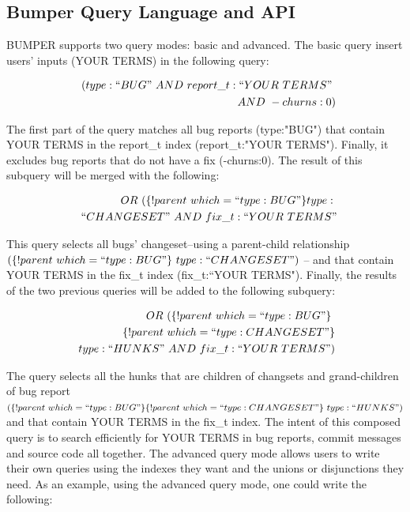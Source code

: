 \documentclass[conference]{IEEEtran}
\begin{document}
\subsection{Bumper Query Language and API}
\label{sub:Bumper Query Language and API}

BUMPER supports two query modes: basic and advanced.
The basic query insert users' inputs (YOUR TERMS) in the
following query:

\begin{equation*}
\begin{split}
~~(type:``BUG"~AND~report\_t:``YOUR~TERMS"~\\
~~AND~-churns:0)
\end{split}
\end{equation*}



The first part of the query matches all bug reports
(type:"BUG") that contain YOUR TERMS in the report\_t index
(report\_t:"YOUR TERMS").
Finally, it excludes bug reports that
do not have a fix (-churns:0).
The result of this subquery will be
merged with the following:

\begin{equation*}
\begin{split}
~~OR~(\{!parent~which=``type:BUG"\}type:~\\
~~``CHANGESET"~AND~fix\_t:``YOUR~TERMS"
\end{split}
\end{equation*}

This query selects all bugs' changeset--using a parent-child
relationship $(\{!parent~which=``type:BUG"\}~type:
  ``CHANGESET")$ -- and that contain YOUR TERMS in the fix\_t
  index (fix\_t:``YOUR TERMS").
Finally, the results of the two
previous queries will be added to the following subquery:

\begin{equation*}
\begin{split}
  OR~(\{!parent~which=``type:BUG"\}\ \\
~\{!parent~which=``type:CHANGESET"\}\\
~type:``HUNKS"~AND~fix\_t:``YOUR~TERMS")
\end{split}
\end{equation*}

The query selects all the hunks that are children of changsets and
grand-children of bug report $ (\{!parent~which=``type:BUG"\}
  \{!parent~which=``type:CHANGESET"\}~type:``HUNKS")$
and that
contain YOUR TERMS in the fix\_t index.
The intent of this composed query is to search efficiently for
YOUR TERMS in bug reports, commit messages and source
code all together.
The advanced query mode allows users to write their own
queries using the indexes they want and the unions or disjunctions
they need.
As an example, using the advanced query mode, one
could write the following:
\end{document}
